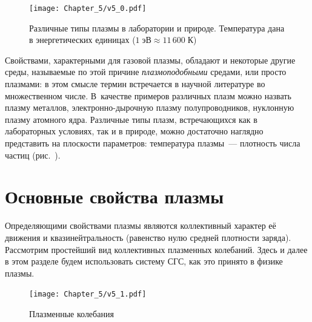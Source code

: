 \begin{figure}[t]
    \centering
	\texttt{[image: Chapter\_5/v5\_0.pdf]}
	\caption{Различные типы плазмы в лаборатории и природе. Температура
    дана в энергетических единицах ($1\;эВ\approx 11\,600\;К$)}
\end{figure}

Свойствами, характерными для газовой плазмы, обладают и некоторые другие среды,
называемые по этой причине
\emph{плазмоподобными} средами, или просто плазмами: в этом смысле термин
 встречается в научной литературе во множественном числе.
В~качестве примеров различных плазм можно назвать плазму металлов,
электронно-дырочную плазму полупроводников, нуклонную плазму атомного ядра.
Различные типы плазм, встречающихся как в лабораторных условиях,
так и в природе, можно достаточно наглядно представить на плоскости параметров:
температура плазмы~--- плотность числа частиц (рис.~).

\section{Основные свойства плазмы}

Определяющими свойствами плазмы являются коллективный характер её движения
и квазинейтральность (равенство нулю средней плотности заряда).
Рассмотрим простейший вид коллективных плазменных колебаний. Здесь и далее
в этом разделе будем использовать систему СГС, как это принято в физике плазмы.

\begin{figure}
    \centering
    \texttt{[image: Chapter\_5/v5\_1.pdf]}
    \caption{Плазменные колебания}
\end{figure}

